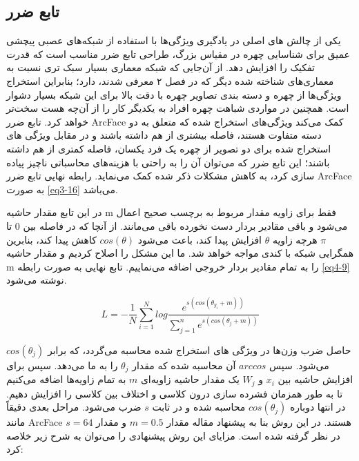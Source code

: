 \subsection{تابع ضرر}
یکی از چالش های اصلی در یادگیری ویژگی‌ها با استفاده از شبکه‌های عصبی پیچشی عمیق   برای شناسایی چهره در مقیاس بزرگ، طراحی تابع ضرر مناسب است که قدرت تفکیک را افزایش دهد. از آن‌جایی که ‌شبکه  معماری بسیار سبک تری نسبت به معماری‌های شناخته شده دیگر که در فصل ۲ معرفی شدند، دارد؛ بنابراین استخراج ویژگی‌ها از چهره و دسته بندی تصاویر چهره با دقت بالا برای این شبکه بسیار دشوار است. همچنین در مواردی شباهت چهره افراد به یکدیگر ‌کار را از آن‌چه هست سخت‌تر خواهد کرد. تابع ضرر ArcFace \cite{deng2019arcface} کمک می‌کند ویژگی‌های استخراج شده که متعلق به دو دسته متفاوت هستند، فاصله بیشتری از هم داشته باشند و در مقابل ویژگی های استخراج شده برای دو تصویر از چهره یک فرد یکسان، فاصله کمتری از هم داشته باشند؛ این تابع ضرر که می‌توان آن را به راحتی با هزینه‌های محاسباتی ناچیز پیاده سازی کرد، به کاهش مشکلات ذکر شده کمک می‌نماید. رابطه نهایی تابع ضرر ArcFace به صورت \ref{eq3-16} می‌باشد.

\noindent 
در این تابع مقدار حاشیه m فقط برای زاویه مقدار مربوط به برچسب صحیح اعمال می‌شود و باقی مقادیر بردار دست نخورده باقی می‌مانند. از آنچا که در فاصله بین 0 تا $\pi$ هرچه زاویه $\theta$ افزایش پیدا کند، باعث می‌شود $cos(\theta)$ کاهش پیدا کند، بنابرین همگرایی شبکه با کندی مواجه خواهد شد. ما این مشکل را اصلاح کردیم و مقدار حاشیه m را به تمام مقادیر بردار خروجی اضافه می‌نماییم. تابع نهایی به صورت رابطه \ref{eq4-9} نوشته می‌شود.

\begin{equation}
L = - \frac{1}{N} \sum_{i=1}^{N} log \frac{e^{s(cos(\theta_{y_i}+m))}}{\sum_{j=1}^{n} e^{s(cos(\theta_j + m))}}
\label{eq4-9}
\end{equation}

\noindent 
حاصل ضرب وزن‌‌ها در ویژگی های استخراج شده محاسبه می‌گردد، که برابر $cos(\theta_j)$ می‌شود‌‌. سپس $arccos$ آن محاسبه شده که مقدار $\theta_j$ را به ما می‌دهد. سپس برای افزایش حاشیه بین $x_i$ و $W_j$ یک مقدار حاشیه زاویه‌ای $m$ به تمام زاویه‌ها اضافه می‌کنیم‌ تا به طور همزمان فشرده سازی درون کلاسی و اختلاف بین کلاسی را افزایش دهیم. در انتها دوباره $cos(\theta_j)$ محاسبه شده و در ثابت $s$ ضرب می‌شود.  مراحل بعدی دقیقاً مانند ArcFace هستند. در این روش بنا به پیشنهاد مقاله \cite{deng2019arcface} مقدار $m=0.5$ و مقدار $s=64$ در نظر گرفته شده است. مزایای این روش پیشنهادی را می‌توان به شرح زیر خلاصه کرد:

